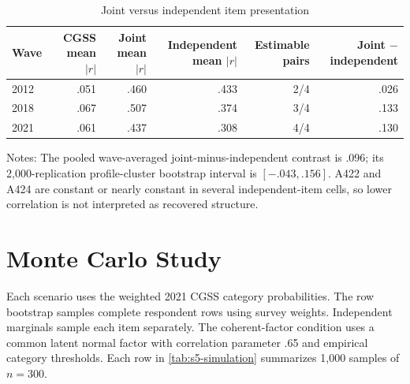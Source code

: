 \documentclass[11pt]{article}
\begin{document}
\begin{table}[!htbp]
\centering
\caption{Joint versus independent item presentation}
\label{tab:s4c-independent}
\begin{threeparttable}
\small
\begin{tabular}{lrrrrr}
\toprule
Wave & CGSS mean $|r|$ & Joint mean $|r|$ & Independent mean $|r|$
& Estimable pairs & Joint $-$ independent \\
\midrule
2012 & .051 & .460 & .433 & 2/4 & .026 \\
2018 & .067 & .507 & .374 & 3/4 & .133 \\
2021 & .061 & .437 & .308 & 4/4 & .130 \\
\bottomrule
\end{tabular}
\begin{tablenotes}[flushleft]
\footnotesize
\item Notes: The pooled wave-averaged joint-minus-independent contrast is .096; its 2,000-replication
profile-cluster bootstrap interval is $[-.043,.156]$. A422 and A424 are constant or nearly constant
in several independent-item cells, so lower correlation is not interpreted as recovered structure.
\end{tablenotes}
\end{threeparttable}
\end{table}

\section{Monte Carlo Study}

Each scenario uses the weighted 2021 CGSS category probabilities. The row bootstrap samples complete
respondent rows using survey weights. Independent marginals sample each item separately. The
coherent-factor condition uses a common latent normal factor with correlation parameter .65 and
empirical category thresholds. Each row in \cref{tab:s5-simulation} summarizes 1,000 samples of
$n=300$.
\end{document}
